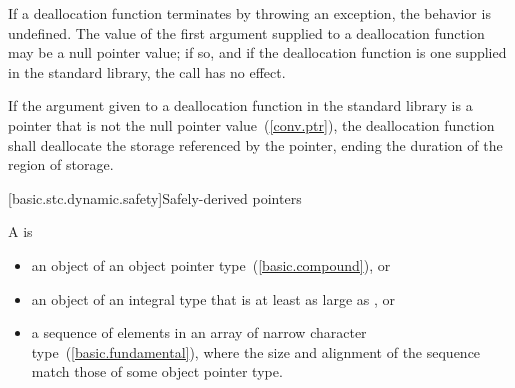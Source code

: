 \pnum
If a deallocation function terminates by throwing an exception, the behavior is undefined.
The value of the first argument supplied to a deallocation function may
be a null pointer value; if so, and if the deallocation function is one
supplied in the standard library, the call has no effect.

\pnum
If the argument given to a deallocation function in the standard library
is a pointer that is not the null pointer value~(\ref{conv.ptr}), the
deallocation function shall deallocate the storage referenced by the
pointer, ending the duration of the region of storage.

[basic.stc.dynamic.safety]{Safely-derived pointers}

\pnum
{}%
%
A  is
\begin{itemize}
\item an object of an object pointer
type~(\ref{basic.compound}), or
\item an object of an integral type that is at least as large as ,
or
\item a sequence of elements in an array of narrow character
type~(\ref{basic.fundamental}), where the size and alignment of the sequence
match those of some object pointer type.
\end{itemize}

